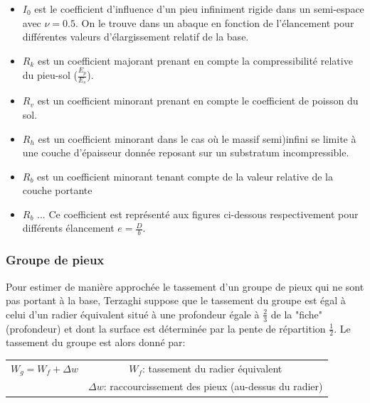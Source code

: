         \begin{itemize}
            \item $I_0$ est le coefficient d'influence d'un pieu infiniment rigide dans un semi-espace avec $\nu=0.5$. On le trouve dans un abaque en fonction de l'élancement pour différentes valeurs d'élargissement relatif de la base.
            \item $R_k$ est un coefficient majorant prenant en compte la compressibilité relative du pieu-sol ($\frac{E_p}{E_s}$).
            \item $R_v$ est un coefficient minorant prenant en compte le coefficient de poisson du sol.
            \item $R_h$ est un coefficient minorant dans le cas où le massif semi)infini se limite à une couche d'épaisseur donnée reposant sur un substratum incompressible.
            \item $R_b$ est un coefficient minorant tenant compte de la valeur relative de la couche portante
            \item $R_b$ ... Ce coefficient est représenté aux figures ci-dessous respectivement pour différents élancement $e = \frac{D}{b}$.
        \end{itemize}
        
        \subsubsection{Groupe de pieux}
        
        Pour estimer de manière approchée le tassement d'un groupe de pieux qui ne sont pas portant à la base, Terzaghi suppose que le tassement du groupe est égal à celui d'un radier équivalent situé à une profondeur égale à $\frac{2}{3}$ de la "fiche" (profondeur) et dont la surface est déterminée par la pente de répartition $\frac{1}{2}$. Le tassement du groupe est alors donné par:
        
        \begin{center}
        \begin{tabular}{c|c}
             $W_g = W_f + \Delta w $ \: \: \:
             &  $W_f$: tassement du radier équivalent  \\
             &  $\Delta w$: raccourcissement des pieux (au-dessus du radier)  
        \end{tabular}
        \end{center} 
        
